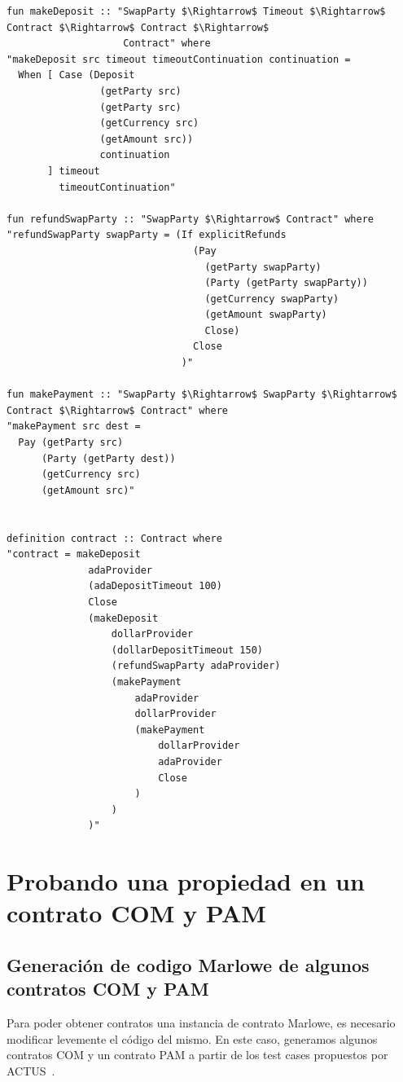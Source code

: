 \documentclass[12pt]{book}
\begin{document}
\begin{lstlisting}[style=Isabelle, caption=Definición del contrato \textit{Swap}]
fun makeDeposit :: "SwapParty $\Rightarrow$ Timeout $\Rightarrow$ Contract $\Rightarrow$ Contract $\Rightarrow$
                    Contract" where
"makeDeposit src timeout timeoutContinuation continuation =
  When [ Case (Deposit 
                (getParty src)
                (getParty src)
                (getCurrency src) 
                (getAmount src))
                continuation
       ] timeout
         timeoutContinuation"

fun refundSwapParty :: "SwapParty $\Rightarrow$ Contract" where
"refundSwapParty swapParty = (If explicitRefunds
                                (Pay
                                  (getParty swapParty)
                                  (Party (getParty swapParty))
                                  (getCurrency swapParty)
                                  (getAmount swapParty)
                                  Close)
                                Close
                              )"

fun makePayment :: "SwapParty $\Rightarrow$ SwapParty $\Rightarrow$ Contract $\Rightarrow$ Contract" where
"makePayment src dest =
  Pay (getParty src)
      (Party (getParty dest))
      (getCurrency src)
      (getAmount src)"


definition contract :: Contract where
"contract = makeDeposit 
              adaProvider 
              (adaDepositTimeout 100)
              Close
              (makeDeposit 
                  dollarProvider
                  (dollarDepositTimeout 150)
                  (refundSwapParty adaProvider)
                  (makePayment 
                      adaProvider 
                      dollarProvider
                      (makePayment 
                          dollarProvider 
                          adaProvider
                          Close
                      )
                  )
              )"
\end{lstlisting}

\section{Probando una propiedad en un contrato COM y PAM}

\subsection{Generación de codigo Marlowe de algunos contratos COM y PAM}
Para poder obtener contratos una instancia de contrato Marlowe, es necesario modificar levemente el código del mismo. En este caso, generamos algunos contratos COM y un contrato PAM a partir de los test cases propuestos por ACTUS~\cite{ACTUS_Tests}.
\end{document}
